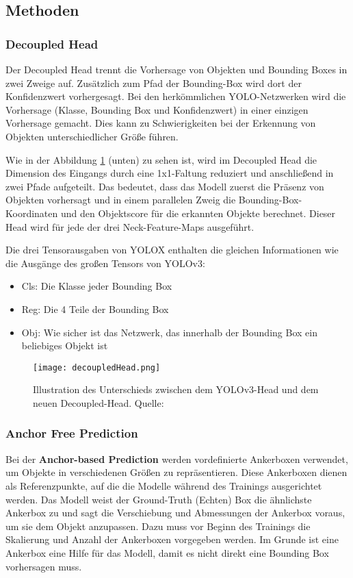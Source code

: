 \subsection{Methoden}
\subsubsection{Decoupled Head}\label{chap:decoupledHead}
Der Decoupled Head trennt die Vorhersage von Objekten und Bounding Boxes in zwei Zweige auf. Zusätzlich zum Pfad der Bounding-Box wird dort der Konfidenzwert vorhergesagt. Bei den herkömmlichen YOLO-Netzwerken wird die Vorhersage (Klasse, Bounding Box und Konfidenzwert) in einer einzigen Vorhersage gemacht. Dies kann zu Schwierigkeiten bei der Erkennung von Objekten unterschiedlicher Größe führen. 

Wie in der Abbildung \ref{fig:decoupledHead} (unten) zu sehen ist, wird im Decoupled Head die Dimension des Eingangs durch eine 1x1-Faltung reduziert und anschließend in zwei Pfade aufgeteilt. Das bedeutet, dass das Modell zuerst die Präsenz von Objekten vorhersagt und in einem parallelen Zweig die Bounding-Box-Koordinaten und den Objektscore für die erkannten Objekte berechnet. Dieser Head wird für jede der drei Neck-Feature-Maps ausgeführt. \cite{yoloxExplanationHowWorks}

Die drei Tensorausgaben von YOLOX enthalten die gleichen Informationen wie die Ausgänge des großen Tensors von YOLOv3:
\begin{itemize}
\item Cls: Die Klasse jeder Bounding Box
\item Reg: Die 4 Teile der Bounding Box
\item Obj: Wie sicher ist das Netzwerk, das innerhalb der Bounding Box ein beliebiges Objekt ist
\end{itemize}


\begin{figure}[h]
	\centering
	\texttt{[image: decoupledHead.png]}
	\caption[Illustration des Unterschieds zwischen dem Yolov3-Head und dem neuen Decoupled-Head ]{Illustration des Unterschieds zwischen dem YOLOv3-Head und dem neuen Decoupled-Head. Quelle: \cite{yoloxPaper}}
	\label{fig:decoupledHead}
\end{figure}




\subsubsection{Anchor Free Prediction}\label{chap:anchorFree}
Bei der \textbf{Anchor-based Prediction} werden vordefinierte Ankerboxen verwendet, um Objekte in verschiedenen Größen zu repräsentieren. Diese Ankerboxen dienen als Referenzpunkte, auf die die Modelle während des Trainings ausgerichtet werden. Das Modell weist der Ground-Truth (Echten) Box die ähnlichste Ankerbox zu und sagt die Verschiebung und Abmessungen der Ankerbox voraus, um sie dem Objekt anzupassen. Dazu muss vor Beginn des Trainings die Skalierung und Anzahl der Ankerboxen vorgegeben werden. Im Grunde ist eine Ankerbox eine Hilfe für das Modell, damit es nicht direkt eine Bounding Box vorhersagen muss.


